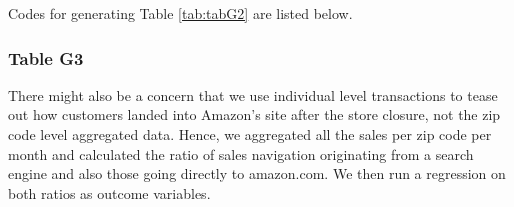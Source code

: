 \documentclass{article}
\begin{document}
Codes for generating Table \ref{tab:tabG2} are listed below.

\pagebreak

\subsubsection{Table G3}
There might also be a concern that we use individual level transactions to tease out how customers landed into Amazon’s site after the store
closure, not the zip code level aggregated data. Hence, we aggregated all the sales per zip code per month and calculated the ratio of sales navigation originating from a search engine and also those going directly to amazon.com. We then run a regression on both ratios as outcome variables.
\end{document}
